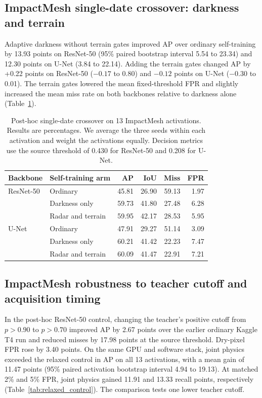 \subsection{ImpactMesh single-date crossover: darkness and terrain}
\label{sec:darkness_crossover}
Adaptive darkness without terrain gates improved AP over ordinary self-training by 13.93 points on ResNet-50 (95\% paired bootstrap interval 5.54 to 23.34) and 12.30 points on U-Net (3.84 to 22.14). Adding the terrain gates changed AP by +0.22 points on ResNet-50 ($-0.17$ to 0.80) and $-0.12$ points on U-Net ($-0.30$ to 0.01). The terrain gates lowered the mean fixed-threshold FPR and slightly increased the mean miss rate on both backbones relative to darkness alone (Table~\ref{tab:darkness_crossover}).

\begin{table}[pos=t]
\centering
\caption{Post-hoc single-date crossover on 13 ImpactMesh activations. Results are percentages. We average the three seeds within each activation and weight the activations equally. Decision metrics use the source threshold of 0.430 for ResNet-50 and 0.208 for U-Net.}
\label{tab:darkness_crossover}
\begin{tabular}{@{}llrrrr@{}}
\toprule
Backbone & Self-training arm & AP & IoU & Miss & FPR \\
\midrule
ResNet-50 & Ordinary & 45.81 & 26.90 & 59.13 & 1.97 \\
          & Darkness only & 59.73 & 41.80 & 27.48 & 6.28 \\
          & Radar and terrain & 59.95 & 42.17 & 28.53 & 5.95 \\
\addlinespace
U-Net & Ordinary & 47.91 & 29.27 & 51.14 & 3.09 \\
      & Darkness only & 60.21 & 41.42 & 22.23 & 7.47 \\
      & Radar and terrain & 60.09 & 41.47 & 22.91 & 7.21 \\
\bottomrule
\end{tabular}
\end{table}

\subsection{ImpactMesh robustness to teacher cutoff and acquisition timing}
In the post-hoc ResNet-50 control, changing the teacher's positive cutoff from $p>0.90$ to $p>0.70$ improved AP by 2.67 points over the earlier ordinary Kaggle T4 run and reduced misses by 17.98 points at the source threshold. Dry-pixel FPR rose by 3.40 points. On the same GPU and software stack, joint physics exceeded the relaxed control in AP on all 13 activations, with a mean gain of 11.47 points (95\% paired activation bootstrap interval 4.94 to 19.13). At matched 2\% and 5\% FPR, joint physics gained 11.91 and 13.33 recall points, respectively (Table~\ref{tab:relaxed_control}). The comparison tests one lower teacher cutoff.

